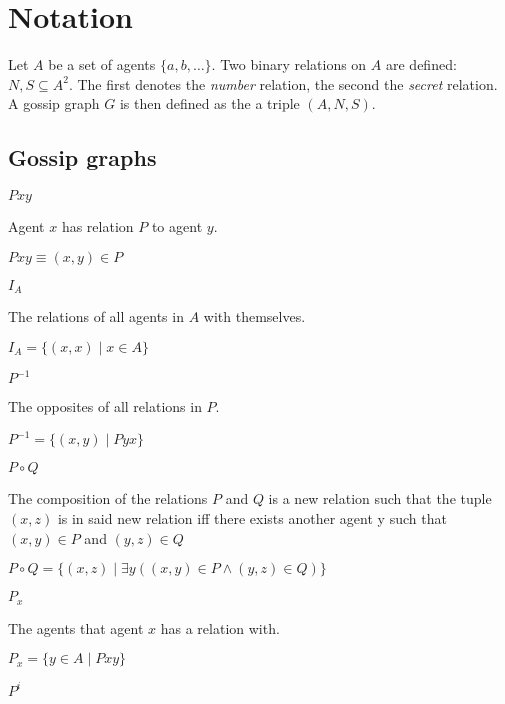 
\section{Notation}\label{ap:a}

Let \(A\) be a set of agents \(\{a, b, \dots\}\).
Two binary relations on \(A\) are defined: \(N, S \subseteq A^2\).
The first denotes the \textit{number} relation, the second the \textit{secret} relation.
A gossip graph \(G\) is then defined as the a triple \((A, N, S)\).

\subsection{Gossip graphs}

\begin{description}
    \item[Binary relation] \(Pxy\)

        Agent \(x\) has relation \(P\) to agent \(y\).

        \(Pxy \equiv (x, y) \in P\)

    \item[Identity relation] \(I_A\)

        The relations of all agents in \(A\) with themselves.

        \(I_A = \{(x,x) \mid x \in A\}\)

    \item[Converse relation] \(P^{-1}\)

        The opposites of all relations in \(P\).

        \(P^{-1} = \{(x,y) \mid Pyx\}\)

    \item[Composition relation] \(P \circ Q\)

        The composition of the relations \(P\) and \(Q\) is a new relation such that the tuple \((x,z)\) is in said new relation iff there exists another agent y such that \((x,y) \in P\) and \((y,z) \in Q\)

        \(P \circ Q = \{(x,z) \mid \exists y ((x, y) \in P \land (y, z) \in Q) \}\)

    \item \(P_x\)
    
        The agents that agent \(x\) has a relation with.

        \(P_x = \{ y \in A \mid Pxy \}\)

    \item \(P^i\)


\end{description}
